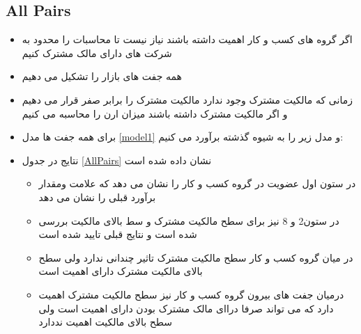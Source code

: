 \documentclass[12pt, a4paper]{article}
\begin{document}
\subsection{All Pairs}
\begin{itemize}
	\item 
	اگر گروه های کسب و کار اهمیت داشته باشند نیاز نیست تا محاسبات را محدود به شرکت های دارای مالک مشترک کنیم
	\item
	همه جفت های بازار را تشکیل می دهیم
	\item
	زمانی که مالکیت مشترک وجود ندارد مالکیت مشترک را برابر صفر قرار می دهیم و اگر مالکیت مشترک داشته باشند میزان ارن را محاسبه می کنیم
	\item
	برای همه جفت ها مدل 
	\ref{model1}
	و مدل زیر را به شیوه گذشته برآورد می کنیم:
	
	\item
	نتایج در جدول 
	\ref{AllPairs}
	نشان داده شده است
	\begin{itemize}
		\item 
		در ستون اول عضویت در گروه کسب و کار را نشان می دهد که علامت ومقدار برآورد قبلی را نشان می دهد
		\item 
		در ستون2 و 8 نیز برای سطح مالکیت مشترک و سط بالای مالکیت بررسی شده است و نتایج قبلی تایید شده است
		\item 
		در میان گروه کسب و کار سطح مالکیت مشترک تاثیر چندانی ندارد ولی سطح بالای مالکیت مشترک دارای اهمیت است
		\item
		درمیان جفت های بیرون گروه کسب و کار نیز سطح مالکیت مشترک اهمیت دارد که می تواند صرفا دراای مالک مشترک بودن دارای اهمیت است ولی سطح بالای مالکیت اهمیت نددارد
		
	\end{itemize}
\end{itemize}

\begin{landscape}
\begin{LTR}
\end{LTR}
\end{landscape}


\FloatBarrier
\end{document}
